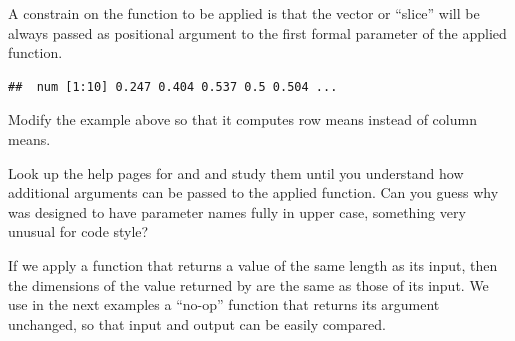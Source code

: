 \documentclass[krantz2]{krantz}\usepackage{knitr}%
\begin{document}
\begin{warningbox}
A constrain on the function to be applied is that the vector or ``slice'' will be always passed as positional argument to the first formal parameter of the applied function.
\end{warningbox}

\begin{knitrout}\footnotesize
{}\color{fgcolor}\begin{kframe}
\begin{alltt}
 \hlkwb{<-} \hlstd{(}\hlstd{(}\hlstd{),}  \hlstd{=} \hlstd{)}
 \hlkwb{<-}   \hlstd{=} \hlstd{,}  
\end{alltt}
\begin{verbatim}
##  num [1:10] 0.247 0.404 0.537 0.5 0.504 ...
\end{verbatim}
\end{kframe}
\end{knitrout}

\begin{playground}
Modify the example above so that it computes row means instead of column means.
\end{playground}

\begin{playground}
Look up the help pages for  and  and study them until you understand how additional arguments can be passed to the applied function. Can you guess why  was designed to have parameter names fully in upper case, something very unusual for \Rlang code style?
\end{playground}

If we apply a function that returns a value of the same length as its input, then the dimensions of the value returned by  are the same as those of its input. We use in the next examples a ``no-op'' function that returns its argument unchanged, so that input and output can be easily compared.
\end{document}
